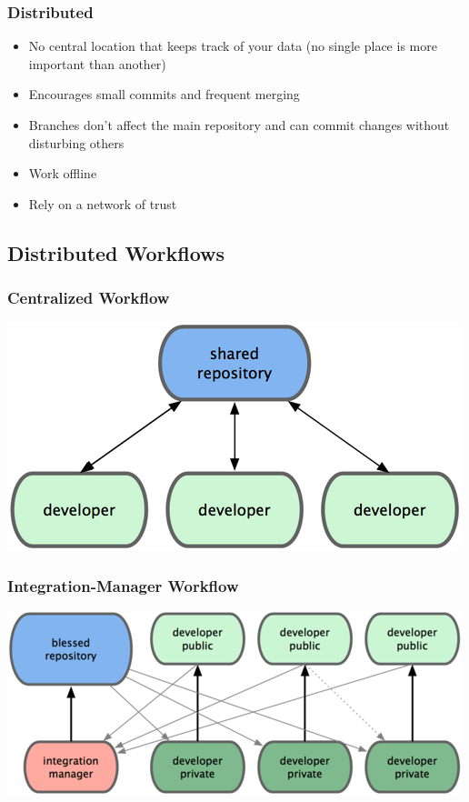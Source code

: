 \documentclass[english,compress]{beamer}
\begin{document}
\frame
{
    \frametitle{Distributed}
    \begin{itemize}
        \item No central location that keeps track of your data (no single place is more important than another)
        \item Encourages small commits and frequent merging
        \item Branches don't affect the main repository and can commit changes without disturbing others
        \item Work offline
        \item Rely on a network of trust
    \end{itemize}
}

\subsection{Distributed Workflows}
\frame
{
    \frametitle{Centralized Workflow}

    \begin{center}
        \includegraphics[width=.7\textwidth]{figs/centralized-workflow.png}\cite{book}
    \end{center}
}

\frame
{
    \frametitle{Integration-Manager Workflow}

    \begin{center}
        \includegraphics[width=.7\textwidth]{figs/integration-manager-workflow.png}\cite{book}
    \end{center}

}
\end{document}

